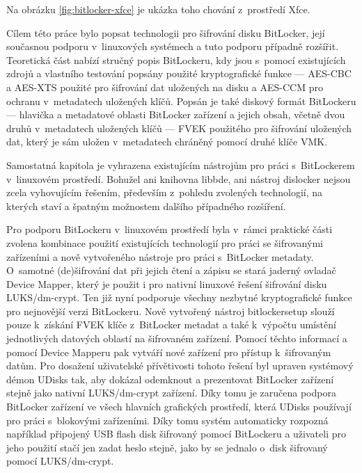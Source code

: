Na obrázku \ref{fig:bitlocker-xfce} je ukázka toho chování z~prostředí Xfce.



Cílem této práce bylo popsat technologii pro šifrování disku BitLocker, její současnou podporu v~linuxových systémech a tuto podporu případně rozšířit. Teoretická část nabízí stručný popis BitLockeru, kdy jsou s~pomocí existujících zdrojů a vlastního testování popsány použité kryptografické funkce --- AES-CBC a AES-XTS použité pro šifrování dat uložených na disku a AES-CCM pro ochranu v~metadatech uložených klíčů. Popsán je také diskový formát BitLockeru --- hlavička a metadatové oblasti BitLocker zařízení a jejich obsah, včetně dvou druhů v~metadatech uložených klíčů --- FVEK použitého pro šifrování uložených dat, který je sám uložen v~metadatech chráněný pomocí druhé klíče VMK.

Samostatná kapitola je vyhrazena existujícím nástrojům pro práci s~BitLockerem v~linuxovém prostředí. Bohužel ani knihovna libbde, ani nástroj dislocker nejsou zcela vyhovujícím řešením, především z~pohledu zvolených technologií, na kterých staví a špatným možnostem dalšího případného rozšíření.

Pro podporu BitLockeru v~linuxovém prostředí byla v~rámci praktické části zvolena kombinace použití existujících technologií pro práci se šifrovanými zařízeními a nově vytvořeného nástroje pro práci s~BitLocker metadaty. O~samotné (de)šifrování dat při jejich čtení a zápisu se stará jaderný ovladač Device Mapper, který je použit i pro nativní linuxové řešení šifrování disku LUKS/dm-crypt. Ten již nyní podporuje všechny nezbytné kryptografické funkce pro nejnovější verzi BitLockeru. Nově vytvořený nástroj bitlockersetup slouží pouze k~získání FVEK klíče z~BitLocker metadat a také k~výpočtu umístění jednotlivých datových oblastí na šifrovaném zařízení. Pomocí těchto informací a pomocí Device Mapperu pak vytváří nové zařízení pro přístup k~šifrovaným datům. Pro dosažení uživatelské přívětivosti tohoto řešení byl upraven systémový démon \mbox{UDisks} tak, aby dokázal odemknout a prezentovat BitLocker zařízení stejně jako nativní LUKS/dm-crypt zařízení. Díky tomu je zaručena podpora BitLocker zařízení ve všech hlavních grafických prostředí, která UDisks používají pro práci s~blokovými zařízeními. Díky tomu systém automaticky rozpozná například připojený USB flash disk šifrovaný pomocí BitLockeru a uživateli pro jeho použití stačí jen zadat heslo stejně, jako by se jednalo o~disk šifrovaný pomocí LUKS/dm-crypt.

